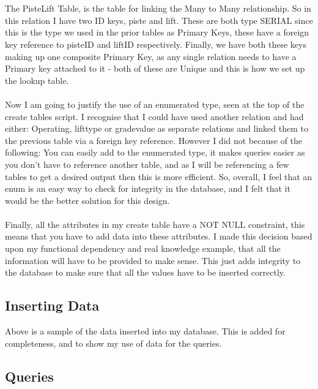 \documentclass[12pt]{article}
\begin{document}
~\\\\
The PisteLift Table, is the table for linking the Many to Many relationship. So in this relation I have two ID keys, piste and lift. These are both type SERIAL since this is the type we used in the prior tables as Primary Keys, these have a foreign key reference to pisteID and liftID respectively. Finally, we have both these keys making up one composite Primary Key, as any single relation needs to have a Primary key attached to it - both of these are Unique and this is how we set up the lookup table.
~\\\\
Now I am going to justify the use of an enumerated type, seen at the top of the create tables script. I recognise that I could have used another relation and had either: Operating, lifttype or gradevalue as separate relations and linked them to the previous table via a foreign key reference. However I did not because of the following: You can easily add to the enumerated type, it makes queries easier as you don't have to reference another table, and as I will be referencing a few tables to get a desired output then this is more efficient. So, overall, I feel that an enum is an easy way to check for integrity in the database, and I felt that it would be the better solution for this design.
~\\\\
Finally, all the attributes in my create table have a NOT NULL constraint, this means that you have to add data into these attributes. I made this decision based upon my functional dependency and real knowledge example, that all the information will have to be provided to make sense. This just adds integrity to the database to make sure that all the values have to be inserted correctly.
\newpage
\subsection{Inserting Data}


Above is a sample of the data inserted into my database. This is added for completeness, and to show my use of data for the queries.
\newpage
\subsection{Queries}
\end{document}
